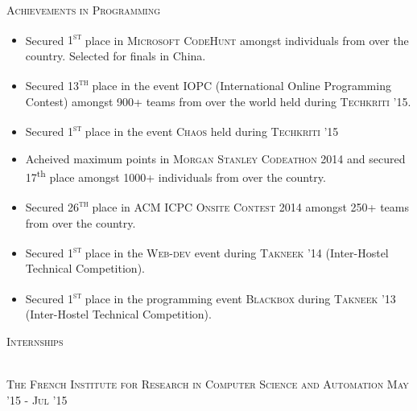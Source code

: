 \documentclass[10pt]{article}
\begin{document}
	{\centering\Large{\textsc{Achievements in Programming}} \hrulefill}

	\begin{itemize}
	\setlength\itemsep{-0.25em}
	\item Secured \textsc{1\textsuperscript{st}} place in \textsc{Microsoft CodeHunt} amongst individuals from over the country. Selected for finals in China.
	\item Secured \textsc{13\textsuperscript{th}} place in the event \textsc{IOPC} (International Online Programming Contest) amongst 900+ teams from over the world held during \textsc{Techkriti '15}.
	\item Secured \textsc{1\textsuperscript{st}} place in the event \textsc{Chaos} held during \textsc{Techkriti '15}
	\item
	Acheived maximum points in \textsc{Morgan Stanley Codeathon 2014} and secured 17\textsuperscript{th} place amongst 1000+ individuals from over the country.
	\item Secured \textsc{26\textsuperscript{th}} place in \textsc{ACM ICPC Onsite Contest} 2014 amongst \textsc{250+} teams from over the country.
	\item Secured \textsc{1\textsuperscript{st}} place in the \textsc{Web-dev} event during \textsc{Takneek '14} (Inter-Hostel Technical Competition).
	\item Secured \textsc{1\textsuperscript{st}} place in the programming event \textsc{Blackbox} during \textsc{Takneek '13} (Inter-Hostel Technical Competition).

	\end{itemize}
	
	{\centering\Large{\textsc{Internships}}	\hrulefill}
	
	\vspace{3mm}
	
	{}	\hfill{} \\
	\small\textsc{The French Institute for Research in Computer Science and Automation}
	\hfill{\small{\textsc{May '15 - Jul '15}}}
	
\end{document}
